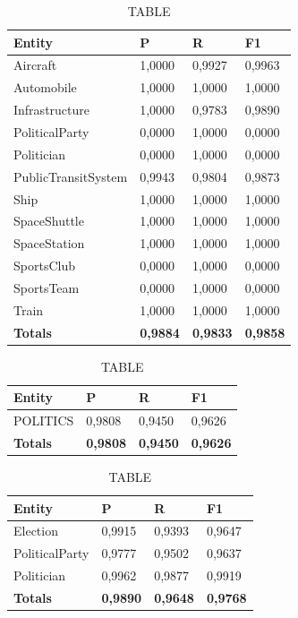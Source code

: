 \documentclass[thesis=M,english]{FITthesis}[2018/05/30]
\begin{document}
	\begin{table}[H]\centering
		\caption{TABLE}
		\label{}
		\begin{tabular}{|l|l|l|l|}
			\hline {\textbf{Entity}} & {\textbf{P}} & {\textbf{R}} & {\textbf{F1}}\\\hline
				Aircraft & 1,0000 & 0,9927 & 0,9963\\
				Automobile & 1,0000 & 1,0000 & 1,0000\\				
				Infrastructure & 1,0000 & 0,9783 & 0,9890\\
				PoliticalParty & 0,0000 & 1,0000 & 0,0000\\				
				Politician & 0,0000 & 1,0000 & 0,0000\\				
				PublicTransitSystem & 0,9943 & 0,9804 & 0,9873\\
				Ship & 1,0000 & 1,0000 & 1,0000\\				
				SpaceShuttle & 1,0000 & 1,0000 & 1,0000\\
				SpaceStation & 1,0000 & 1,0000 & 1,0000\\
				SportsClub & 0,0000 & 1,0000 & 0,0000\\
				SportsTeam & 0,0000 & 1,0000 & 0,0000\\
				Train & 1,0000 & 1,0000 & 1,0000\\\hline
				\textbf{Totals} & \textbf{0,9884} & \textbf{0,9833} & \textbf{0,9858}\\\hline
		\end{tabular}
	\end{table}		
	

	\begin{table}[H]\centering
		\caption{TABLE}
		\label{}
		\begin{tabular}{|l|l|l|l|}
			\hline {\textbf{Entity}} & {\textbf{P}} & {\textbf{R}} & {\textbf{F1}}\\\hline
				POLITICS & 0,9808 & 0,9450 & 0,9626\\\hline
				\textbf{Totals} & \textbf{0,9808} & \textbf{0,9450} & \textbf{0,9626}\\\hline
		\end{tabular}
	\end{table}

	\begin{table}[H]\centering
		\caption{TABLE}
		\label{}
		\begin{tabular}{|l|l|l|l|}
			\hline {\textbf{Entity}} & {\textbf{P}} & {\textbf{R}} & {\textbf{F1}}\\\hline
				Election & 0,9915 & 0,9393 & 0,9647\\
				PoliticalParty & 0,9777 & 0,9502 & 0,9637\\
				Politician & 0,9962 & 0,9877 & 0,9919\\\hline
				\textbf{Totals} & \textbf{0,9890} & \textbf{0,9648} & \textbf{0,9768}\\\hline
		\end{tabular}
	\end{table}	
	
\end{document}
